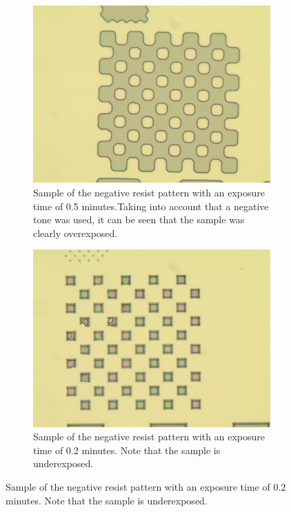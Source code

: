 \begin{figure}[!b]
    \centering
    \begin{subfigure}[t]{0.3\linewidth}
        \centering
        \includegraphics[width=\textwidth]{data/b2d1.jpg}
	    \caption{Sample of the negative resist pattern with an exposure time of 0.5 minutes.Taking into account that a negative tone was used, it can be seen that the sample was clearly overexposed.}
	    \label{fig:b2d1}
    \end{subfigure}
    \hfill
    \begin{subfigure}[t]{0.3\linewidth}
        \centering
        \includegraphics[width=\textwidth]{data/b2h1.jpg}
	    \caption{Sample of the negative resist pattern with an exposure time of 0.2 minutes. Note that the sample is underexposed.}

\end{subfigure}
\end{figure}
